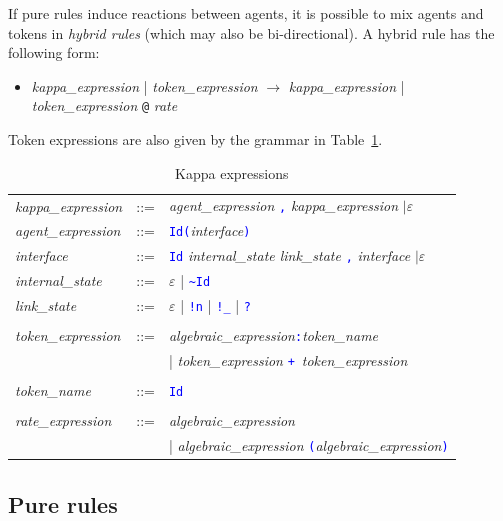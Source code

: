 \documentclass[11pt]{book}
\def\intstate{\textasciitilde}
\def\tcb#1{\textcolor{blue}{\ttt{#1}}}
\def\ttt#1{\texttt{#1}}
\def\rar{\rightarrow}
\def\ITE#1{\begin{itemize}#1\end{itemize}}
\def\imp#1{\emph{#1}\index{#1}}
\begin{document}
If pure rules induce reactions between agents, it is possible to mix agents and tokens in \imp{hybrid rules} (which may also be bi-directional). A hybrid rule has the following form:
 \ITE{
\item[] {\it kappa\_expression} | {\it token\_expression} $\rar$ {\it kappa\_expression}  | {\it token\_expression }\ttt{@} {\it rate}  
}
Token expressions are also given by the grammar in Table~\ref{tab:patterns}.
\begin{table}[h!]
  \centering
  \caption{Kappa expressions}
  \begin{tabular}{@{} lcl @{}}
    \textit{kappa\_expression} & ::= & \textit{agent\_expression} \tcb{,} \textit{kappa\_expression} $\mid\varepsilon$ \\ 
    \textit{agent\_expression} & ::= &  \tcb{Id}\tcb{(}\textit{interface}\tcb{)} \\
    \textit{interface} &::=& \tcb{Id} \textit{internal\_state link\_state}  \tcb{,} \textit{interface} $\mid\varepsilon$ \\
    \textit{internal\_state} &::=& $\varepsilon$ | \tcb{\intstate Id} \\
    \textit{link\_state} &::=& $\varepsilon$ | \tcb{!n} | \tcb{!\_} | \tcb{?}  \\\\
   \textit{token\_expression} &::=&  \textit{algebraic\_expression}\tcb{:}\textit{token\_name} \\
	&&|  \textit{token\_expression} \tcb{+}\ \textit{token\_expression} \\\\
\textit{token\_name} &::=& \tcb{Id}\\\\

    \textit{rate\_expression} &::=& \textit{algebraic\_expression} \\
&&| \textit{algebraic\_expression} \tcb{(}\textit{algebraic\_expression}\tcb{)} 
    \end{tabular}
  \label{tab:patterns}
\end{table}

\subsection{Pure rules}
\end{document}
